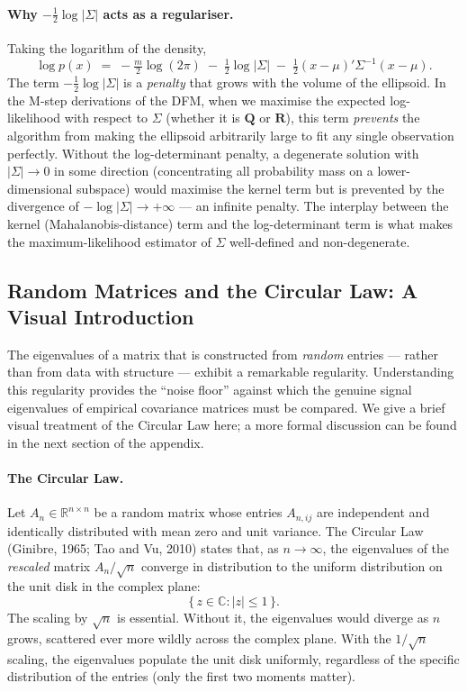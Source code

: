 \documentclass[11pt, a4paper, oneside]{article}
\begin{document}
\paragraph{Why $-\tfrac{1}{2}\log|\Sigma|$ acts as a regulariser.}
Taking the logarithm of the density,
\[
\log p(x) \;=\; -\tfrac{m}{2}\log(2\pi) \;-\; \tfrac{1}{2}\log|\Sigma| \;-\; \tfrac{1}{2}(x-\mu)'\Sigma^{-1}(x-\mu).
\]
The term $-\tfrac{1}{2}\log|\Sigma|$ is a \emph{penalty} that grows
with the volume of the ellipsoid. In the M-step derivations of the
DFM, when we maximise the expected log-likelihood with respect to
$\Sigma$ (whether it is $\mathbf{Q}$ or $\mathbf{R}$), this term
\emph{prevents} the algorithm from making the ellipsoid arbitrarily
large to fit any single observation perfectly. Without the
log-determinant penalty, a degenerate solution with $|\Sigma| \to 0$
in some direction (concentrating all probability mass on a
lower-dimensional subspace) would maximise the kernel term but is
prevented by the divergence of $-\log|\Sigma| \to +\infty$ — an
infinite penalty. The interplay between the kernel
(Mahalanobis-distance) term and the log-determinant term is what
makes the maximum-likelihood estimator of $\Sigma$ well-defined and
non-degenerate.

\newpage

\subsection{Random Matrices and the Circular Law: A Visual Introduction}
\label{sec:appendix-circular-law}

The eigenvalues of a matrix that is constructed from \emph{random}
entries — rather than from data with structure — exhibit a
remarkable regularity. Understanding this regularity provides the
``noise floor'' against which the genuine signal eigenvalues of
empirical covariance matrices must be compared. We give a brief
visual treatment of the Circular Law here; a more formal discussion
can be found in the next section of the appendix.

\paragraph{The Circular Law.}
Let $A_n \in \mathbb{R}^{n \times n}$ be a random matrix whose
entries $A_{n,ij}$ are independent and identically distributed with
mean zero and unit variance. The Circular Law (Ginibre, 1965; Tao
and Vu, 2010) states that, as $n \to \infty$, the eigenvalues of the
\emph{rescaled} matrix $A_n / \sqrt{n}$ converge in distribution to
the uniform distribution on the unit disk in the complex plane:
\[
\big\{\, z \in \mathbb{C} : |z| \leq 1 \,\big\}.
\]
The scaling by $\sqrt{n}$ is essential. Without it, the eigenvalues
would diverge as $n$ grows, scattered ever more wildly across the
complex plane. With the $1/\sqrt{n}$ scaling, the eigenvalues
populate the unit disk uniformly, regardless of the specific
distribution of the entries (only the first two moments matter).
\end{document}
